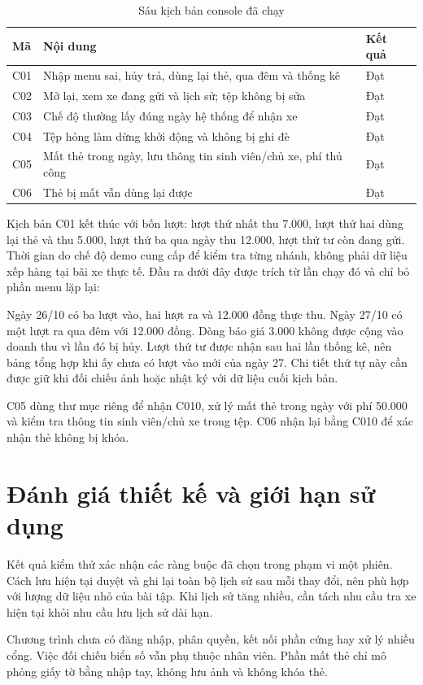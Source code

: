 \begin{table}[H]
\centering\small
\caption{Sáu kịch bản console đã chạy}
\label{tab:cli-results}
\begin{tabularx}{\textwidth}{l Y l}
\toprule
Mã & Nội dung & Kết quả\\
\midrule
C01 & Nhập menu sai, hủy trả, dùng lại thẻ, qua đêm và thống kê & Đạt\\
C02 & Mở lại, xem xe đang gửi và lịch sử; tệp không bị sửa & Đạt\\
C03 & Chế độ thường lấy đúng ngày hệ thống để nhận xe & Đạt\\
C04 & Tệp hỏng làm dừng khởi động và không bị ghi đè & Đạt\\
C05 & Mất thẻ trong ngày, lưu thông tin sinh viên/chủ xe, phí thủ công & Đạt\\
C06 & Thẻ bị mất vẫn dùng lại được & Đạt\\
\bottomrule
\end{tabularx}
\end{table}

Kịch bản C01 kết thúc với bốn lượt: lượt thứ nhất thu 7.000, lượt thứ hai dùng lại thẻ và thu 5.000, lượt thứ ba qua ngày thu 12.000, lượt thứ tư còn đang gửi. Thời gian do chế độ demo cung cấp để kiểm tra từng nhánh, không phải dữ liệu xếp hàng tại bãi xe thực tế. Đầu ra dưới đây được trích từ lần chạy đó và chỉ bỏ phần menu lặp lại:


Ngày 26/10 có ba lượt vào, hai lượt ra và 12.000 đồng thực thu. Ngày 27/10 có một lượt ra qua đêm với 12.000 đồng. Dòng báo giá 3.000 không được cộng vào doanh thu vì lần đó bị hủy. Lượt thứ tư được nhận sau hai lần thống kê, nên bảng tổng hợp khi ấy chưa có lượt vào mới của ngày 27. Chi tiết thứ tự này cần được giữ khi đối chiếu ảnh hoặc nhật ký với dữ liệu cuối kịch bản.

C05 dùng thư mục riêng để nhận C010, xử lý mất thẻ trong ngày với phí 50.000 và kiểm tra thông tin sinh viên/chủ xe trong tệp. C06 nhận lại bằng C010 để xác nhận thẻ không bị khóa.

\section{Đánh giá thiết kế và giới hạn sử dụng}
Kết quả kiểm thử xác nhận các ràng buộc đã chọn trong phạm vi một phiên. Cách lưu hiện tại duyệt và ghi lại toàn bộ lịch sử sau mỗi thay đổi, nên phù hợp với lượng dữ liệu nhỏ của bài tập. Khi lịch sử tăng nhiều, cần tách nhu cầu tra xe hiện tại khỏi nhu cầu lưu lịch sử dài hạn.

Chương trình chưa có đăng nhập, phân quyền, kết nối phần cứng hay xử lý nhiều cổng. Việc đối chiếu biển số vẫn phụ thuộc nhân viên. Phần mất thẻ chỉ mô phỏng giấy tờ bằng nhập tay, không lưu ảnh và không khóa thẻ.
